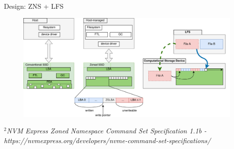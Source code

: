 \documentclass{beamer}
\begin{document}
\begin{frame}{Design: ZNS + LFS}
	\begingroup
	\small
	\begin{figure}[h]
		\centering
		\includegraphics[width=1.0\linewidth]{resources/images/zns-lfs.png}
	\end{figure}
	\textit{\tiny $^{2}$NVM Express Zoned Namespace Command Set Specification 1.1b - https://nvmexpress.org/developers/nvme-command-set-specifications/}
	\endgroup
\end{frame}
\end{document}
